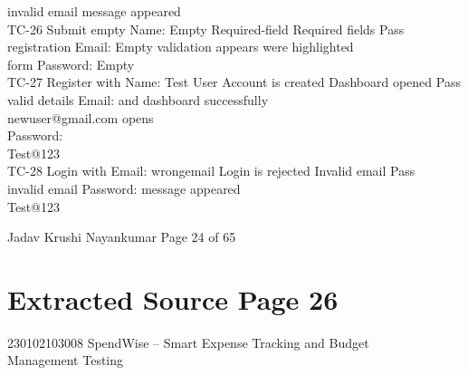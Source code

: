 \documentclass[12pt,a4paper]{report}
\begin{document}
invalid email                                            message appeared\\ 
TC-26     Submit empty Name: Empty           Required-field        Required fields       Pass\\ 
registration    Email: Empty       validation appears were highlighted\\ 
form            Password: Empty\\ 
TC-27     Register with   Name: Test User    Account is created Dashboard opened Pass\\ 
valid details   Email:             and dashboard         successfully\\ 
newuser@gmail.com opens\\ 
Password:\\ 
Test@123\\ 
TC-28     Login with      Email: wrongemail Login is rejected      Invalid email         Pass\\ 
invalid email   Password:                                message appeared\\ 
Test@123\\ 

\smallskip

\smallskip

\smallskip

\smallskip
Jadav Krushi Nayankumar                                                           Page 24 of 65\\ 

\clearpage
\section*{Extracted Source Page 26}
230102103008                           SpendWise – Smart Expense Tracking and Budget\\ 
Management Testing\\ 
\end{document}
